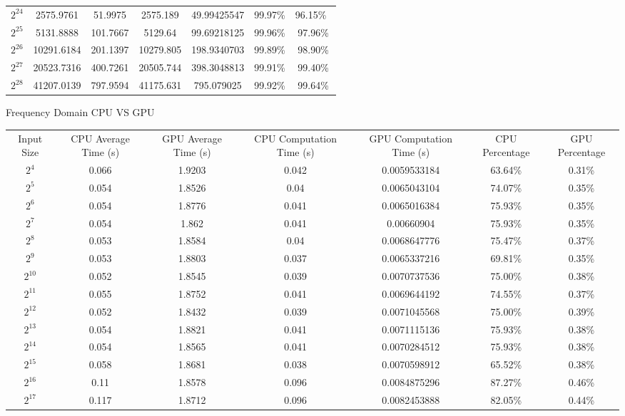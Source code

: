 \begin{center}
\begin{landscape}
\begin{tabular}{c|c|c|c|c|c|c}
        $2^{24}$ & 2575.9761 & 51.9975 & 2575.189 & 49.99425547 & 99.97\% & 96.15\%\ \\
        $2^{25}$ & 5131.8888 & 101.7667 & 5129.64 & 99.69218125 & 99.96\% & 97.96\% \\
        $2^{26}$ & 10291.6184 & 201.1397 & 10279.805 & 198.9340703 & 99.89\% & 98.90\% \\
        $2^{27}$ & 20523.7316 & 400.7261 & 20505.744 & 398.3048813 & 99.91\% & 99.40\% \\
        $2^{28}$ & 41207.0139 & 797.9594 & 41175.631 & 795.079025 & 99.92\% & 99.64\% \\
    \end{tabular}
    
    \newpage
    Frequency Domain CPU VS GPU
    
    \begin{tabular}{c|c|c|c|c|c|c}
         Input Size & CPU Average Time (s) & GPU Average Time (s) & CPU Computation Time (s) & GPU Computation Time (s) & CPU Percentage & GPU Percentage \\
$2^{4}$ & 0.066 & 1.9203 & 0.042 & 0.0059533184 & 63.64\% & 0.31\% \\ 
$2^{5}$ & 0.054 & 1.8526 & 0.04 & 0.0065043104 & 74.07\% & 0.35\% \\ 
$2^{6}$ & 0.054 & 1.8776 & 0.041 & 0.0065016384 & 75.93\% & 0.35\% \\ 
$2^{7}$ & 0.054 & 1.862 & 0.041 & 0.00660904 & 75.93\% & 0.35\% \\ 
$2^{8}$ & 0.053 & 1.8584 & 0.04 & 0.0068647776 & 75.47\% & 0.37\% \\ 
$2^{9}$ & 0.053 & 1.8803 & 0.037 & 0.0065337216 & 69.81\% & 0.35\% \\ 
$2^{10}$ & 0.052 & 1.8545 & 0.039 & 0.0070737536 & 75.00\% & 0.38\% \\ 
$2^{11}$ & 0.055 & 1.8752 & 0.041 & 0.0069644192 & 74.55\% & 0.37\% \\ 
$2^{12}$ & 0.052 & 1.8432 & 0.039 & 0.0071045568 & 75.00\% & 0.39\% \\ 
$2^{13}$ & 0.054 & 1.8821 & 0.041 & 0.0071115136 & 75.93\% & 0.38\% \\ 
$2^{14}$ & 0.054 & 1.8565 & 0.041 & 0.0070284512 & 75.93\% & 0.38\% \\ 
$2^{15}$ & 0.058 & 1.8681 & 0.038 & 0.0070598912 & 65.52\% & 0.38\% \\ 
$2^{16}$ & 0.11 & 1.8578 & 0.096 & 0.0084875296 & 87.27\% & 0.46\% \\ 
$2^{17}$ & 0.117 & 1.8712 & 0.096 & 0.0082453888 & 82.05\% & 0.44\% \\ 

\end{tabular}
\end{landscape}
\end{center}
